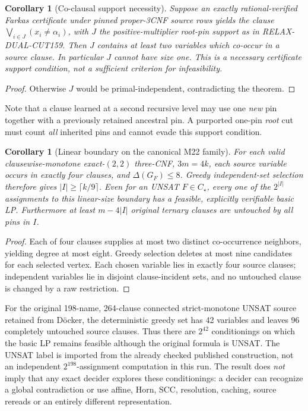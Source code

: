 \documentclass[11pt]{article}
\newtheorem{corollary}[theorem]{Corollary}
\begin{document}
\begin{corollary}[Co-clausal support necessity]
Suppose an exactly rational-verified Farkas certificate under pinned
proper-3CNF source rows yields the clause
\(\bigvee_{i\in J}(x_i\ne\alpha_i)\), with \(J\) the positive-multiplier
root-pin support as in RELAX-DUAL-CUT159. Then \(J\) contains at least two
variables which co-occur in a source clause.
In particular \(J\) cannot have size one. This is a necessary
certificate support condition, not a sufficient criterion for infeasibility.
\end{corollary}
\begin{proof}
Otherwise \(J\) would be primal-independent, contradicting the theorem.
\end{proof}
Note that a clause learned at a second recursive level may use one
\emph{new} pin together with a previously retained ancestral pin.
A purported one-pin \emph{root} cut must count \emph{all} inherited pins
and cannot evade this support condition.

\begin{corollary}[Linear boundary on the canonical M22 family]
For each valid clausewise-monotone exact-\((2,2)\) three-CNF,
\(3m=4k\), each source variable occurs in exactly four clauses,
and \(\Delta(G_F)\le8\). Greedy independent-set selection therefore
gives \(|I|\ge\lceil k/9\rceil\). Even for an UNSAT \(F\in C_\star\),
every one of the \(2^{|I|}\) assignments to this linear-size boundary has
a feasible, explicitly verifiable basic LP. Furthermore at least
\(m-4|I|\) original ternary clauses are untouched by \emph{all} pins in \(I\).
\end{corollary}
\begin{proof}
Each of four clauses supplies at most two distinct co-occurrence
neighbors, yielding degree at most eight. Greedy selection deletes
at most nine candidates for each selected vertex. Each chosen
variable lies in exactly four source clauses; independent variables
lie in disjoint clause-incident sets, and no untouched clause is changed
by a raw restriction.
\end{proof}
For the original 198-name, 264-clause connected strict-monotone UNSAT
source retained from D\"ocker, the deterministic greedy set has 42
variables and leaves 96 completely untouched source clauses. Thus
there are \(2^{42}\) conditionings on which the basic LP remains
feasible although the original formula is UNSAT. The UNSAT label is
imported from the already checked published construction, not
an independent \(2^{198}\)-assignment computation in this run.
The result does \emph{not} imply that any exact decider explores these
conditionings: a decider can recognize a global contradiction or
use affine, Horn, SCC, resolution, caching, source rereads or an entirely
different representation.
\end{document}
